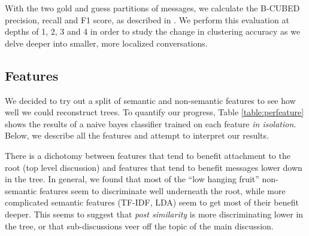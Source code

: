 \documentclass{article}
\begin{document}
With the two gold and guess partitions of messages, we calculate the B-CUBED
precision, recall and F1 score, as described in \cite{Bagga98}. We perform
this evaluation at depths of 1, 2, 3 and 4 in order to study the change in
clustering accuracy as we delve deeper into smaller, more localized
conversations.

\subsection{Features}
\label{sec:features}
We decided to try out a split of semantic and non-semantic features to see how
well we could reconstruct trees. To quantify our progress, Table
\ref{table:perfeature} shows the results of a naive bayes classifier trained on
each feature \textit{in isolation}. Below, we describe all the features and
attempt to interpret our results. 

There is a dichotomy between features that tend to benefit attachment to the
root (top level discussion) and features that tend to benefit messages lower
down in the tree. In general, we found that most of the ``low hanging fruit''
non-semantic features seem to discriminate well underneath the root, while
more complicated semantic features (TF-IDF, LDA) seem to get most of their
benefit deeper. This seems to suggest that \textit{post similarity} is more
discriminating lower in the tree, or that sub-discussions veer off the topic
of the main discussion.
\end{document}
